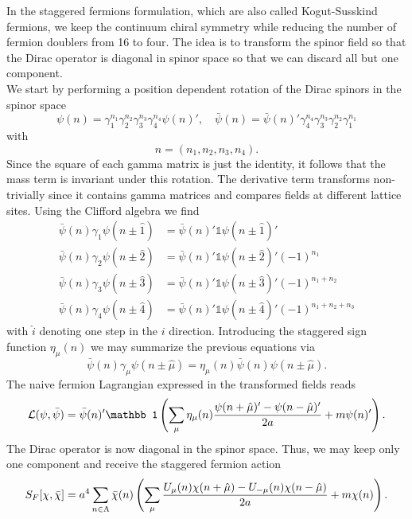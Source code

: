 In the staggered fermions formulation, which are also called Kogut-Susskind fermions, we keep the continuum chiral symmetry while reducing the number of fermion doublers from 16 to four. The idea is to transform the spinor field so that the Dirac operator is diagonal in spinor space so that we can discard all but one component. \\
We start by performing a position dependent rotation of the Dirac spinors in the spinor space
\begin{equation}
    \psi(n)=\gamma_1^{n_1}\gamma_2^{n_2}\gamma_3^{n_3}\gamma_4^{n_4}\psi(n)',\quad \bar\psi(n)=\bar\psi(n)'\gamma_4^{n_4}\gamma_3^{n_3}\gamma_2^{n_2}\gamma_1^{n_1}
\end{equation}
with
\begin{equation}
    n=(n_1,n_2,n_3,n_4).
\end{equation}
Since the square of each gamma matrix is just the identity, it follows that the mass term is invariant under this rotation. The derivative term transforms non-trivially since it contains gamma matrices and compares fields at different lattice sites. Using the Clifford algebra we find
\begin{align}
    \bar\psi(n)\gamma_1\psi(n\pm\hat1)&=\bar\psi(n)'\mathbb1\psi(n\pm\hat1)'\\
    \bar\psi(n)\gamma_2\psi(n\pm\hat2)&=\bar\psi(n)'\mathbb1\psi(n\pm\hat2)'(-1)^{n_1}\\
    \bar\psi(n)\gamma_3\psi(n\pm\hat3)&=\bar\psi(n)'\mathbb1\psi(n\pm\hat3)'(-1)^{n_1+n_2}\\
    \bar\psi(n)\gamma_4\psi(n\pm\hat4)&=\bar\psi(n)'\mathbb1\psi(n\pm\hat4)'(-1)^{n_1+n_2+n_3}
\end{align}
with $\hat i$ denoting one step in the $i$ direction. Introducing the staggered sign function $\eta_\mu(n)$ we may summarize the previous equations via
\begin{equation}
    \bar\psi(n)\gamma_\mu\psi(n\pm\hat\mu)=\eta_\mu(n)\bar\psi(n)\psi(n\pm\hat\mu).
\end{equation}
The naive fermion Lagrangian expressed in the transformed fields reads
\begin{equation}
    \lagr(\psi, \bar\psi)=\bar\psi(n)'\mathbb1\rbr{\sum_\mu\eta_\mu(n)\frac{\psi(n+\hat\mu)'-\psi(n-\hat\mu)'}{2a}+m\psi(n)'}.
\end{equation}
The Dirac operator is now diagonal in the spinor space. Thus, we may keep only one component and receive the staggered fermion action 
\begin{equation}
    S_F[\chi,\bar\chi]=a^4\sum_{n\in\Lambda}\bar\chi(n)\left(\sum_\mu\frac{U_\mu(n)\chi(n+\hat\mu)-U_{-\mu}(n)\chi(n-\hat\mu)}{2a}+m\chi(n)\right).
\end{equation}
